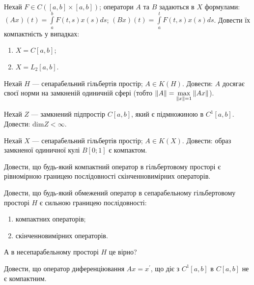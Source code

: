 \begin{exercise}
    Нехай $F \in C([a, b] \times [a, b])$; оператори $A$ та $B$ задаються в $X$ формулами:
    $(Ax)(t)=\int\limits_a^b F(t, s)x(s)ds$; $(Bx)(t) = \int\limits_a^t F(t, s)x(s)ds$.
    Довести їх компактність у випадках:
    \begin{enumerate}
        \item $X = C[a, b]$;
        \item $X = L_2[a, b]$.
    \end{enumerate}
\end{exercise}

\begin{exercise}
    Нехай $H$ --- сепарабельний гільбертів простір; $A \in K(H)$. Довести: $A$ 
    досягає своєї норми на замкненій одиничній сфері (тобто $\left\lVert A\right\rVert = 
    \underset{\left\lVert x\right\rVert = 1}{\max}\left\lVert Ax\right\rVert$).
\end{exercise}

\begin{exercise}\label{N:1_5_20}
    Нехай $Z$ --- замкнений підпростір $C[a, b]$, який є підмножиною в $C^1[a, b]$. 
    Довести: $\mathrm{dim} Z < \infty$.
\end{exercise}

\begin{exercise}
    Нехай $X$ --- сепарабельний гільбертів простір; $A \in K(X)$. Довести: образ замкненої 
    одиничної кулі $B[0; 1]$ є компактом.
\end{exercise}

\begin{exercise}
    Довести, що будь-який компактний оператор в гільбертовому просторі є рівномірною 
    границею послідовності скінченновимірних операторів.
\end{exercise}

\begin{exercise}\label{N:1_5_23}
    Довести, що будь-який обмежений оператор в сепарабельному гільбертовому просторі $H$ є 
    сильною границею послідовності:
    \begin{enumerate}
        \item компактних операторів;
        \item скінченновимірних операторів.
    \end{enumerate}
    А в несепарабельному просторі $H$ це вірно?
\end{exercise}

\begin{exercise}
    Довести, що оператор диференціювання $Ax = x^\prime$, що діє з $C^1[a, b]$ в $C[a, b]$ 
    не є компактним.
\end{exercise}